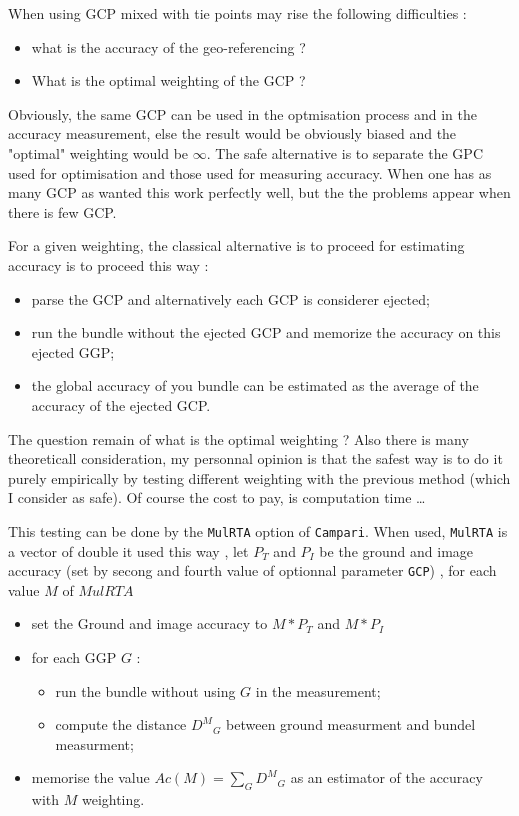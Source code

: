 When using GCP mixed with tie points may rise the following difficulties :


\begin{itemize}

 \item what is the accuracy of the geo-referencing ?
 \item What is the optimal weighting of the GCP ?

\end{itemize}

Obviously, the same GCP can be used in the optmisation process and in the accuracy measurement, else
the result would be obviously biased and the "optimal" weighting would be $\infty$.  The safe alternative
is to separate the GPC used for optimisation and those used for measuring accuracy. When one has
as many GCP as wanted this work perfectly well, but the the problems appear when there is few GCP.

For a given weighting, the classical alternative is to proceed for estimating accuracy is to proceed this way :

\begin{itemize}

 \item parse the GCP and alternatively each GCP is considerer ejected;
 \item run the bundle without the ejected GCP and memorize the accuracy on this ejected GGP;
 \item the global accuracy of you bundle can be estimated as the average of the accuracy of the ejected 
       GCP.
\end{itemize}

The question remain of what is the optimal weighting ? Also there is many theoreticall consideration,
my personnal opinion is that the safest way is to do it purely empirically by testing different
weighting with the previous method (which I consider as safe).  Of course the cost to pay, is
computation time \dots

This testing can be done by the {\tt MulRTA} option of {\tt Campari}. When used,  {\tt MulRTA}
is a vector of double it used this way ,
 let $P_T$ and $P_I$ be the ground and image accuracy (set by  secong and fourth value of
optionnal parameter {\tt GCP}) , for each value $M$ of $MulRTA$

\begin{itemize}
       \item set the Ground and image accuracy to $M*P_T$ and  $M*P_I$
       \item for each GGP $G$ :
       \begin{itemize}
             \item run the bundle without using $G$ in the measurement;
             \item compute the distance ${D^M}_G$ between ground measurment and bundel measurment;
       \end{itemize}
       \item memorise the value $Ac(M)=\sum_G {D^M}_G$ as an estimator of the accuracy with $M$ weighting.
\end{itemize}

